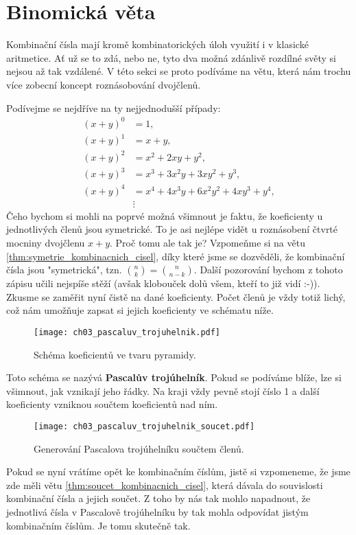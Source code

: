 \section{Binomická věta}

Kombinační čísla mají kromě kombinatorických úloh využití i v klasické aritmetice. Ať už se to zdá, nebo ne, tyto dva možná zdánlivě rozdílné světy si nejsou až tak vzdálené. V této sekci se proto podíváme na větu, která nám trochu více zobecní koncept roznásobování dvojčlenů.\par
Podívejme se nejdříve na ty nejjednodušší případy:
\begin{align*}
    (x+y)^0&=1,\\
    (x+y)^1&=x+y,\\
    (x+y)^2&=x^2+2xy+y^2,\\
    (x+y)^3&=x^3+3x^2y+3xy^2+y^3,\\
    (x+y)^4&=x^4+4x^3y+6x^2y^2+4xy^3+y^4,\\
    &\vdots
\end{align*}
Čeho bychom si mohli na poprvé možná všimnout je faktu, že koeficienty u jednotlivých členů jsou symetrické. To je asi nejlépe vidět u roznásobení čtvrté mocniny dvojčlenu $x+y$. Proč tomu ale tak je? Vzpomeňme si na větu \ref{thm:symetrie_kombinacnich_cisel}, díky které jsme se dozvěděli, že kombinační čísla jsou "symetrická", tzn. $\binom{n}{k}=\binom{n}{n-k}$. Další pozorování bychom z tohoto zápisu učili nejspíše stěží (avšak klobouček dolů všem, kteří to již vidí :-)). Zkusme se zaměřit nyní čistě na dané koeficienty. Počet členů je vždy totiž lichý, což nám umožňuje zapsat si jejich koeficienty ve schématu níže.
\begin{figure}[H]
    \centering
    \texttt{[image: ch03\_pascaluv\_trojuhelnik.pdf]}
    \caption{Schéma koeficientů ve tvaru pyramidy.}
    \label{fig:pascaluv_trojuhelnik}
\end{figure}
Toto schéma se nazývá \textbf{Pascalův trojúhelník}. Pokud se podíváme blíže, lze si všimnout, jak vznikají jeho řádky. Na kraji vždy pevně stojí číslo 1 a další koeficienty vzniknou součtem koeficientů nad ním.
\begin{figure}[H]
    \centering
    \texttt{[image: ch03\_pascaluv\_trojuhelnik\_soucet.pdf]}
    \caption{Generování Pascalova trojúhelníku součtem členů.}
    \label{fig:pascaluv_trojuhelnik_soucet}
\end{figure}
Pokud se nyní vrátíme opět ke kombinačním číslům, jistě si vzpomeneme, že jsme zde měli větu \ref{thm:soucet_kombinacnich_cisel}, která dávala do souvislosti kombinační čísla a jejich součet. Z toho by nás tak mohlo napadnout, že jednotlivá čísla v Pascalově trojúhelníku by tak mohla odpovídat jistým kombinačním číslům. Je tomu skutečně tak.
